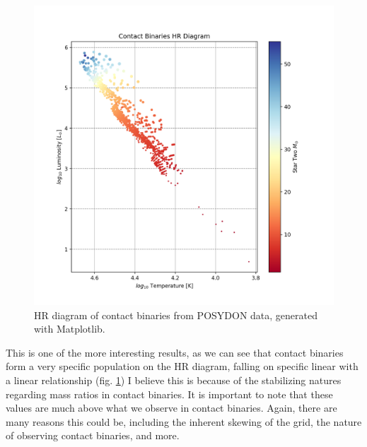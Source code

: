 \documentclass[12pt, a4paper]{article}
\begin{document}
        \begin{figure}[H]
            \centering
            \includegraphics[scale = .6]{figs/GeneratedFigs/W_UMa/ContactbinaryHRDiagram.png}
            \caption{HR diagram of contact binaries from POSYDON data, generated with Matplotlib.}
            \label{contactBinaryHRDiagram}
        \end{figure}

        This is one of the more interesting results, as we can see that contact binaries form a very specific population on the HR diagram, falling on specific linear with a linear relationship (fig. \ref{contactBinaryHRDiagram}) I believe this is because of the stabilizing natures regarding mass ratios in contact binaries. It is important to note that these values are much above what we observe in contact binaries. Again, there are many reasons this could be, including the inherent skewing of the grid, the nature of observing contact binaries, and more. 
        
\end{document}
